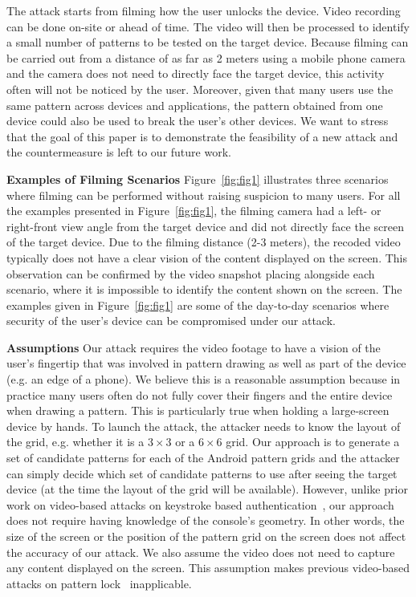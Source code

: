 The attack starts from filming how the user unlocks the device. Video recording
can be done on-site or ahead of time. The video will then be processed to identify a small number of patterns to be
tested on the target device. Because filming can be carried out from a distance of as far as 2 meters using a
mobile phone camera and the camera does not need to directly face the target device, this activity often will not be
noticed by the user. Moreover, given that many users use the same pattern across devices and applications, the pattern
obtained from one device could also be used to break the user's other devices.  We want to stress that the goal of this paper is to
demonstrate the feasibility of a new attack and the countermeasure is left to our future work.

\noindent \textbf{Examples of Filming Scenarios} Figure~\ref{fig:fig1} illustrates three scenarios where filming can be
performed without raising suspicion to many users. For all the examples presented in Figure~\ref{fig:fig1}, the
filming camera had a left- or right-front view angle from the target device and did not directly face the screen of the target device. Due to the filming distance (2-3 meters), the recoded video typically does not have a clear vision of
the content displayed on the screen.  This observation can be confirmed by the video snapshot placing
alongside each scenario, where it is impossible to identify the content shown on the screen.
The examples given in Figure~\ref{fig:fig1} are some of the day-to-day
scenarios where security of the user's device can be compromised under
our attack.

\noindent \textbf{Assumptions}
Our attack requires the video footage to have a vision of the user's
fingertip that was involved in pattern drawing as well as part of the device (e.g. an edge of a phone).
We believe this is a reasonable assumption because in practice many users often do not fully cover their fingers and the entire device when drawing a pattern.
This is particularly true when holding a large-screen device by hands.
To launch the
attack, the attacker needs to know the layout of the grid, e.g. whether it is
a $3 \times 3$ or a $6 \times 6$ grid. Our approach is to generate a set of
candidate patterns for each of the Android pattern grids and the attacker can simply decide
which set of candidate patterns to use after seeing the target device (at the time the
layout of the grid will be available). However, unlike prior work on
video-based attacks on keystroke based authentication~\cite{shukla2014beware}, our approach does not
require having knowledge of the console's geometry. In other words, the size
of the screen or the position of the pattern grid  on the screen does not
affect the accuracy of our attack. We also assume the video does not need to
capture any content displayed on the screen. This assumption makes previous
video-based attacks on pattern lock~\cite{aviv2010smudge} inapplicable.

